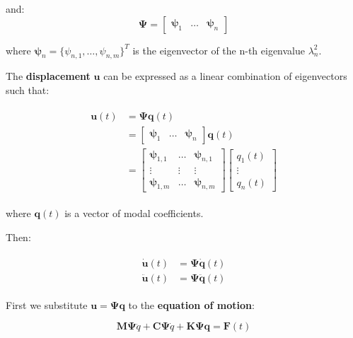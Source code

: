 \documentclass[10pt,b5paper,titlepage]{book}
\newenvironment{ematrix}
{
    \begin{eqnarray}
        \begin{aligned}
}
{
        \end{aligned}
    \end{eqnarray}
}
\begin{document}
and:
\begin{equation}
    \mathbf{\Psi} =
    \begin{bmatrix}
        \mathbf{\psi}_1 & \dots & \mathbf{\psi}_n
    \end{bmatrix}
\end{equation}

where $ \mathbf{\psi}_n = \{\psi_{n,1}, \dots, \psi_{n,m}\}^T $ is the eigenvector
of the n-th eigenvalue $ \lambda_n^2 $.

The \textbf{displacement} $ \mathbf{u} $ can be expressed as a linear combination
of eigenvectors such that:

\begin{ematrix}
    \mathbf{u}(t)
    &= \mathbf{\Psi} \mathbf{q}(t) \\
    &= \begin{bmatrix}
        \mathbf{\psi}_1 & \dots & \mathbf{\psi}_n
    \end{bmatrix} \mathbf{q}(t) \\
    &= \begin{bmatrix}
        \mathbf{\psi}_{1,1} & \dots & \mathbf{\psi}_{n,1} \\
        \vdots & \vdots & \vdots \\
        \mathbf{\psi}_{1,m} & \dots & \mathbf{\psi}_{n,m}
    \end{bmatrix}
    \begin{bmatrix}
        q_1(t) \\
        \vdots \\
        q_n(t)
    \end{bmatrix}
\end{ematrix}

where $ \mathbf{q}(t) $ is a vector of modal coefficients.

Then:

\begin{ematrix}
    \dot{\mathbf{u}}(t) &= \mathbf{\Psi} \dot{\mathbf{q}}(t) \\
    \ddot{\mathbf{u}}(t) &= \mathbf{\Psi} \ddot{\mathbf{q}}(t)
\end{ematrix}

First we substitute $ \mathbf{u} = \mathbf{\Psi}\mathbf{q} $ to the
\textbf{equation of motion}:

\begin{equation}
    \mathbf{M} \mathbf{\Psi} \ddot{q} +
    \mathbf{C} \mathbf{\Psi} \dot{q} +
    \mathbf{K}\mathbf{\Psi}\mathbf{q}
    = \mathbf{F}(t)
\end{equation}
\end{document}
